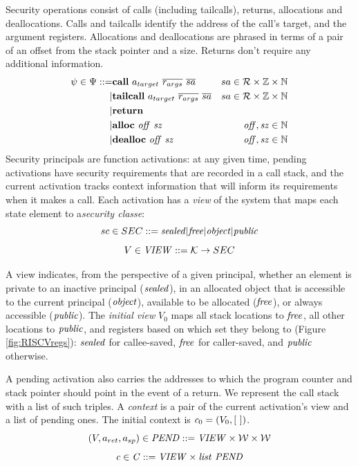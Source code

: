\documentclass[10pt,conference]{ieeetran}%
\theoremstyle{definition}
\begin{document}
Security operations consist of calls (including tailcalls), returns,
allocations and deallocations. Calls and tailcalls identify the address of the call's target,
and the argument registers. Allocations and deallocations are phrased in terms of a pair
of an offset from the stack pointer and a size. Returns don't require any additional information.
%
\begin{align*}
  \psi \in \Psi ::= & \mathbf{call} ~ a_{target} ~ \overline{r_{args}} ~ \overline{sa} &
  sa \in {\mathcal R} \times \mathbb{Z} \times \mathbb{N} \\
  | & \mathbf{tailcall} ~ a_{target}  ~ \overline{r_{args}} ~ \overline{sa} &
  sa \in {\mathcal R} \times \mathbb{Z} \times \mathbb{N} \\
  | & \mathbf{return} & \\
  | & \mathbf{alloc} ~ \mathit{off ~ sz} & \mathit{off, sz} \in \mathbb{N} \\
  | & \mathbf{dealloc} ~ \mathit{off ~ sz} & \mathit{off, sz} \in \mathbb{N} \\
\end{align*}
%
Security principals are function activations: at any given time, pending activations
have security requirements that are recorded in a call stack, and the current
activation tracks context information that will inform its requirements when
it makes a call. Each activation has a {\it view}
of the system that maps each state element to a{\it security classe}:
\[sc \in SEC ::= \mathit{sealed} | \mathit{free} | \mathit{object} | \mathit{public}\]
\[V \in \mathit{VIEW} ::= {\mathcal K} \rightarrow SEC\]

A view indicates, from the perspective of a given principal, whether an element is
private to an inactive principal (\(\mathit{sealed}\)),
in an allocated object that is accessible to the current principal (\(\mathit{object}\)),
available to be allocated (\(\mathit{free}\)), or
always accessible (\(\mathit{public}\)).
The {\it initial view} \(V_0\) maps all stack locations to \(\mathit{free}\),
all other locations to \(\mathit{public}\), and registers based on which set they
belong to (Figure \ref{fig:RISCVregs}): \(\mathit{sealed}\) for callee-saved,
\(\mathit{free}\) for caller-saved, and \(\mathit{public}\) otherwise.

A pending activation also carries the addresses to which the program counter
and stack pointer should point in the event of a return. We represent the call
stack with a list of such triples. A {\it context} is a pair of the current activation's view
and a list of pending ones.
The initial context is \(\mathit{c}_0 = (V_0, [ ~ ])\).
\[(V, a_{ret}, a_{sp}) \in \mathit{PEND} ::= \mathit{VIEW \times {\mathcal W} \times {\mathcal W}}\]
\[\mathit{c} \in \mathit{C} ::= \mathit{VIEW \times list ~ PEND}\]
\end{document}
